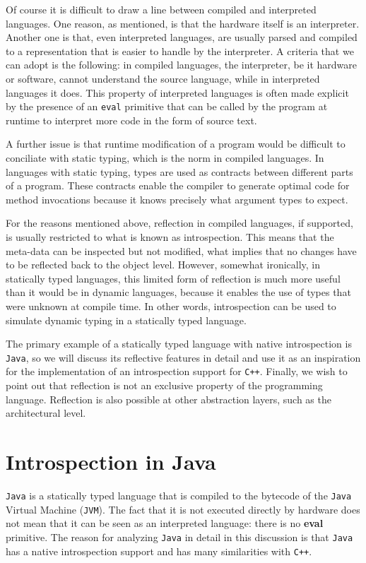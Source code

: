 Of course it is difficult to draw a line between compiled and interpreted languages. One reason, as mentioned, is that the hardware
itself is an interpreter. Another one is that, even interpreted languages, are usually parsed and compiled to a representation that is
easier to handle by the interpreter. A criteria that we can adopt is the following: in compiled languages, the interpreter, be it hardware
or software, cannot understand the source language, while in interpreted languages it does. This property of interpreted
languages is often made explicit by the presence of an \texttt{eval} primitive that can be called by the program at runtime
to interpret more code in the form of source text.

A further issue is that runtime modification of a program would be difficult to conciliate with static typing, which is the norm
in compiled languages. In languages with static typing, types are used as contracts between different parts of a program. 
These contracts enable the compiler to generate optimal code for method invocations because it knows precisely what argument
types to expect.

For the reasons mentioned above, reflection in compiled languages, if supported, is usually restricted to what is known
as introspection. This means that the meta-data can be inspected but not modified, what implies that no changes
have to be reflected back to the object level. However, somewhat ironically, in statically typed languages, this
limited form of reflection is much more useful than it would be in dynamic languages, because it enables the use of types
that were unknown at compile time. In other words, introspection can be used to simulate dynamic typing in a statically typed language.

The primary example of a statically typed language with native introspection is \texttt{Java}, so we will discuss its reflective features in detail
and use it as an inspiration for the implementation of an introspection support for \texttt{C++}. Finally, we wish to point out that reflection
is not an exclusive property of the programming language. Reflection is also possible at other abstraction layers, such as the architectural
level.


\section{Introspection in Java}

\texttt{Java} is a statically typed language that is compiled to the bytecode of the \texttt{Java} Virtual Machine (\texttt{JVM}). The fact that it is not executed
directly by hardware does not mean that it can be seen as an interpreted language: there is no \textbf{eval} primitive.
The reason for analyzing \texttt{Java} in detail in this discussion is that \texttt{Java} has a native introspection support and has many
similarities with \texttt{C++}.

